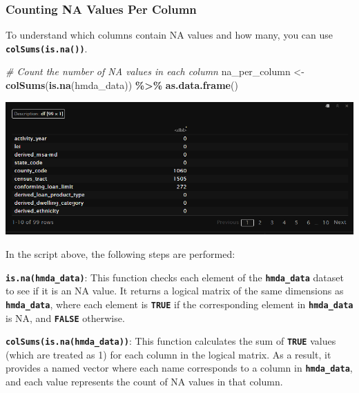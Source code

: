 \documentclass[
]{book}
\newenvironment{Shaded}{\begin{snugshade}}{\end{snugshade}}
\newcommand{\CommentTok}[1]{\textcolor[rgb]{0.56,0.35,0.01}{\textit{#1}}}
\newcommand{\FunctionTok}[1]{\textcolor[rgb]{0.13,0.29,0.53}{\textbf{#1}}}
\newcommand{\NormalTok}[1]{#1}
\newcommand{\OtherTok}[1]{\textcolor[rgb]{0.56,0.35,0.01}{#1}}
\newcommand{\SpecialCharTok}[1]{\textcolor[rgb]{0.81,0.36,0.00}{\textbf{#1}}}
\begin{document}
\hypertarget{counting-na-values-per-column}{%
\subsubsection*{Counting NA Values Per Column}\label{counting-na-values-per-column}}

To understand which columns contain NA values and how many, you can use \textbf{\texttt{colSums(is.na())}}.

\begin{Shaded}
\begin{Highlighting}[]
\CommentTok{\# Count the number of NA values in each column }
\NormalTok{na\_per\_column }\OtherTok{\textless{}{-}} \FunctionTok{colSums}\NormalTok{(}\FunctionTok{is.na}\NormalTok{(hmda\_data)) }\SpecialCharTok{\%\textgreater{}\%}
  \FunctionTok{as.data.frame}\NormalTok{()}
\end{Highlighting}
\end{Shaded}

\includegraphics{images/na_per_column.PNG}

In the script above, the following steps are performed:

\textbf{\texttt{is.na(hmda\_data)}}: This function checks each element of the \textbf{\texttt{hmda\_data}} dataset to see if it is an NA value. It returns a logical matrix of the same dimensions as \textbf{\texttt{hmda\_data}}, where each element is \textbf{\texttt{TRUE}} if the corresponding element in \textbf{\texttt{hmda\_data}} is NA, and \textbf{\texttt{FALSE}} otherwise.

\textbf{\texttt{colSums(is.na(hmda\_data))}}: This function calculates the sum of \textbf{\texttt{TRUE}} values (which are treated as 1) for each column in the logical matrix. As a result, it provides a named vector where each name corresponds to a column in \textbf{\texttt{hmda\_data}}, and each value represents the count of NA values in that column.
\end{document}

